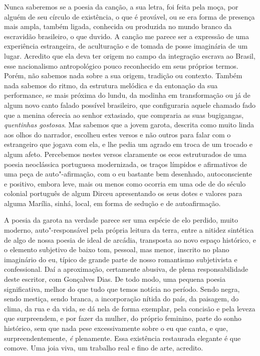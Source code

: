 Nunca saberemos se a poesia da canção, a sua letra, foi feita pela moça,
por alguém de seu círculo de existência, o que é provável, ou se era
forma de presença mais ampla, também ligada, conhecida ou produzida no
mundo branco da escravidão brasileiro, o que duvido. A canção me parece
ser a expressão de uma experiência estrangeira, de aculturação e de
tomada de posse imaginária de um lugar. Acredito que ela deva ter origem
no campo da integração escrava ao Brasil, esse nacionalismo
antropológico pouco reconhecido em seus próprios termos. Porém, não
sabemos nada sobre a sua origem, tradição ou contexto. Também nada
sabemos do ritmo, da estrutura melódica e da entonação da sua
performance, se mais próxima do lundu, da modinha em transformação ou já
de algum novo canto falado possível brasileiro, que configuraria aquele
chamado fado que a menina oferecia ao senhor extasiado, que compraria as
suas bugigangas, \emph{quentinhas gostosas}. Mas sabemos que a jovem
garota, descrita como muito linda aos olhos do narrador, escolheu estes
versos e não outros para falar com o estrangeiro que jogava com ela, e
lhe pedia um agrado em troca de um trocado e algum afeto. Percebemos
nestes versos claramente os ecos estruturados de uma poesia neoclássica
portuguesa modernizada, os traços límpidos e afirmativos de uma peça de
auto"-afirmação, com o eu bastante bem desenhado, autoconsciente e
positivo, embora leve, mais ou menos como ocorria em uma ode de do
século  colonial português de algum Dirceu apresentando os seus
dotes e valores para alguma Marília, sinhá, local, em forma de sedução e
de autoafirmação.

A poesia da garota na verdade parece ser uma espécie de elo perdido,
muito moderno, auto"-responsável pela própria leitura da terra, entre a
nitidez sintética de algo de nossa poesia de ideal de arcádia,
transposta ao novo espaço histórico, e o elemento subjetivo de baixo
tom, pessoal, mas menor, inscrito no plano imaginário do eu, típico de
grande parte de nosso romantismo subjetivista e confessional. Daí a
aproximação, certamente abusiva, de plena responsabilidade deste
escritor, com Gonçalves Dias. De todo modo, uma pequena poesia
significativa, melhor do que tudo que temos notícia no período. Sendo
negra, sendo mestiça, sendo branca, a incorporação nítida do país, da
paisagem, do clima, da rua e da vida, se dá nela de forma exemplar, pela
concisão e pela leveza que surpreendem, e por fazer da mulher, do
próprio feminino, parte do sonho histórico, sem que nada pese
excessivamente sobre o eu que canta, e que, surpreendentemente, \emph{é}
plenamente. Essa existência restaurada elegante é que comove. Uma joia
viva, um trabalho real e fino de arte, acredito.

